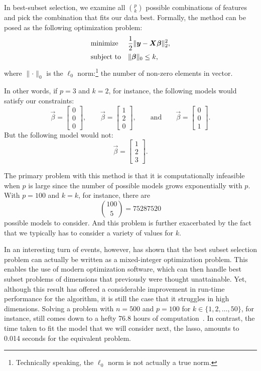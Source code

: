 In best-subset selection, we examine all \(\binom{p}{k}\) possible combinations of features and pick the combination that fits our data best. Formally, the method can be posed as the following optimization problem:
\[
  \begin{aligned}
     & \text{minimize}   &  & \frac{1}{2} \lVert \boldsymbol{y} - \boldsymbol{X}\boldsymbol{\beta}\rVert^2_2, \\
     & \text{subject to} &  & \lVert \boldsymbol{\beta} \rVert_0 \leq k,
  \end{aligned}
\]
where \(\lVert \cdot \rVert_0\) is the \(\ell_0\) norm:\footnote{Technically speaking, the \(\ell_0\) norm is not actually a true norm.} the number of non-zero elements in vector.

In other words, if \(p = 3\) and \(k = 2\), for instance, the following models would satisfy our constraints:
\[
  \vec{\beta} = \begin{bmatrix}0 \\ 0 \\ 0\end{bmatrix},\qquad \vec{\beta} = \begin{bmatrix}1 \\ 2 \\ 0\end{bmatrix},\qquad \text{and} \qquad \vec{\beta} = \begin{bmatrix}0 \\ 0 \\ 1\end{bmatrix}.
\]
But the following model would not:
\[
  \vec{\beta} = \begin{bmatrix}1 \\ 2 \\ 3\end{bmatrix}.
\]


The primary problem with this method is that it is computationally infeasible when \(p\) is large since the number of possible models grows exponentially with \(p\). With \(p = 100\) and \(k = k\), for instance, there are
\[
  \binom{100}{5} = \num{75287520}
\]
possible models to consider. And this problem is further exacerbated by the fact that we typically has to consider a variety of values for \(k\).

In an interesting turn of events, however, \textcite{bertsimas2016} has shown that the best subset selection problem can actually be written as a mixed-integer optimization problem. This enables the use of modern optimization software, which can then handle best subset problems of dimensions that previously were thought unattainable. Yet, although this result has offered a considerable improvement in run-time performance for the algorithm, it is still the case that it struggles in high dimensions. Solving a problem with \(n=500\) and \(p=100\) for \(k \in \{1,2,\dots,50\}\), for instance, still comes down to a hefty 76.8 hours of computation~\parencite{hastie2020}. In contrast, the time taken to fit the model that we will consider next, the lasso, amounts to 0.014 seconds for the equivalent problem.

